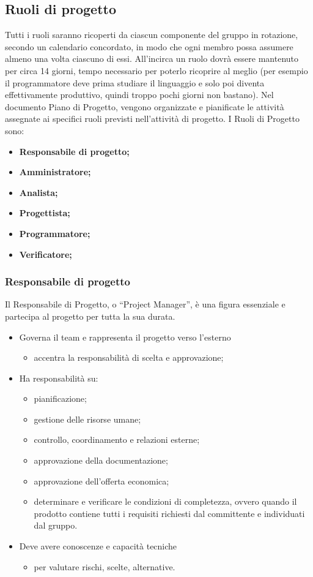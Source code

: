 \subsection{Ruoli di progetto}
Tutti i ruoli saranno ricoperti da ciascun componente del gruppo in rotazione, secondo un calendario concordato, in modo che ogni membro possa assumere almeno una volta ciascuno di essi. All'incirca un ruolo dovrà essere mantenuto per circa 14 giorni, tempo necessario per poterlo ricoprire al meglio (per esempio il programmatore deve prima studiare il linguaggio e solo poi diventa effettivamente produttivo, quindi troppo pochi giorni non bastano).
Nel documento Piano di Progetto, vengono organizzate e pianificate le attività assegnate ai specifici ruoli previsti nell’attività di progetto. I Ruoli di Progetto sono:
\begin{itemize}
\item{\textbf{Responsabile di progetto;}}
\item{\textbf{Amministratore;}}
\item{\textbf{Analista;}}
\item{\textbf{Progettista;}}
\item{\textbf{Programmatore;}}
\item{\textbf{Verificatore;}}
\end{itemize}

\subsubsection{Responsabile di progetto}
Il Responsabile di Progetto,  o  “Project  Manager”,  è una figura essenziale e partecipa al  progetto per tutta la sua durata.  
\begin{itemize}
\item{Governa il team e rappresenta il progetto verso l'esterno}
	\begin{itemize}
	\item{accentra la responsabilità di scelta e approvazione;}
	\end{itemize}
\item{Ha responsabilità su:}
	\begin{itemize}
	\item{pianificazione;}
	\item{gestione delle risorse umane;}
	\item{controllo, coordinamento e relazioni esterne;}
	\item{approvazione della documentazione;}
	\item{approvazione dell’offerta economica;}
	\item{determinare e verificare le condizioni di completezza, ovvero quando il prodotto contiene tutti i requisiti richiesti dal committente e individuati dal gruppo.}
	\end{itemize}
\item{Deve avere conoscenze e capacità tecniche}
	\begin{itemize}
	\item{per valutare rischi, scelte, alternative.}
	\end{itemize}
\end{itemize}

